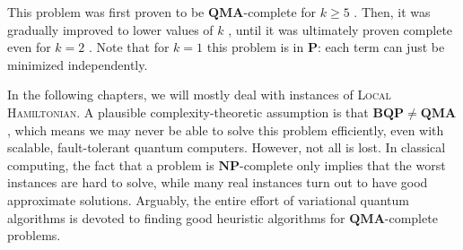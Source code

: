 
This problem was first proven to be $\mathbf{QMA}$-complete for $k \geq 5$ \cite{kitaev_classical_2002}. Then, it was gradually improved to lower values of $k$ \cite{kempe_3-local_2003}, until it was ultimately proven complete even for $k = 2$ \cite{kempe_complexity_2006}. Note that for $k = 1$ this problem is in $\mathbf{P}$: each term can just be minimized independently.

In the following chapters, we will mostly deal with instances of \textsc{Local Hamiltonian}. 
A plausible complexity-theoretic assumption is that $\mathbf{BQP} \neq \mathbf{QMA}$, which means we may never be able to solve this problem efficiently, even with scalable, fault-tolerant quantum computers. 
However, not all is lost. In classical computing, the fact that a problem is $\mathbf{NP}$-complete only implies that the worst instances are hard to solve, while many real instances turn out to have good approximate solutions. Arguably, the entire effort of variational quantum algorithms is devoted to finding good heuristic algorithms for $\mathbf{QMA}$-complete problems.







